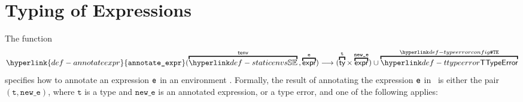 \documentclass{book}
\newcommand\annotateexpr[1]{\hyperlink{def-annotateexpr}{\texttt{annotate\_expr}}(#1)}
\newcommand\vt[0]{\texttt{t}}
\newcommand\newe[0]{\texttt{new\_e}}
\begin{document}

\chapter{Typing of Expressions}
\hypertarget{def-annotateexpr}{}
The function
\[
  \annotateexpr{\overname{\staticenvs}{\tenv} \aslsep \overname{\expr}{\ve}}
  \aslto (\overname{\ty}{\vt} \times \overname{\expr}{\newe})
  \cup \overname{\TTypeError}{\TypeErrorConfig}
\]
specifies how to annotate an expression $\texttt{e}$ in
an environment \tenv.  Formally, the result of annotating the expression
$\texttt{e}$ in \tenv\ is either the pair $(\vt, \newe)$, where $\vt$ is a type and
$\newe$ is an annotated expression, or a type error, and one of the following applies:
\end{document}
